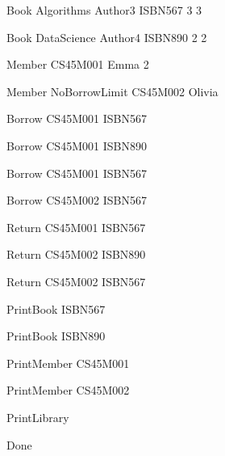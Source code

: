 Book
Algorithms Author3 ISBN567 3 3

Book
DataScience Author4 ISBN890 2 2

Member
CS45M001 Emma 2

Member
NoBorrowLimit CS45M002 Olivia

Borrow
CS45M001 ISBN567

Borrow
CS45M001 ISBN890

Borrow
CS45M001 ISBN567

Borrow
CS45M002 ISBN567

Return
CS45M001 ISBN567

Return
CS45M002 ISBN890

Return
CS45M002 ISBN567

PrintBook
ISBN567

PrintBook
ISBN890

PrintMember
CS45M001

PrintMember
CS45M002

PrintLibrary

Done